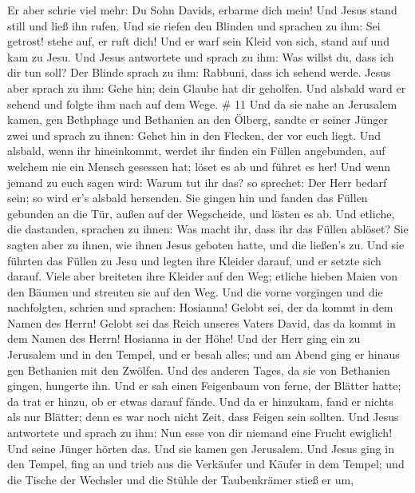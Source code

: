 Er aber schrie viel mehr: Du Sohn Davids, erbarme dich mein!
 Und Jesus stand still und ließ ihn rufen. Und sie riefen
den Blinden und sprachen zu ihm: Sei getrost! stehe auf, er ruft dich!
 Und er warf sein Kleid von sich, stand auf und kam zu
Jesu.  Und Jesus antwortete und sprach zu ihm: Was willst
du, dass ich dir tun soll? Der Blinde sprach zu ihm: Rabbuni, dass ich
sehend werde.  Jesus aber sprach zu ihm: Gehe hin; dein
Glaube hat dir geholfen. Und alsbald ward er sehend und folgte ihm nach
auf dem Wege. \# 11  Und da sie nahe an Jerusalem kamen, gen
Bethphage und Bethanien an den Ölberg, sandte er seiner Jünger zwei
 und sprach zu ihnen: Gehet hin in den Flecken, der vor euch
liegt. Und alsbald, wenn ihr hineinkommt, werdet ihr finden ein Füllen
angebunden, auf welchem nie ein Mensch gesessen hat; löset es ab und
führet es her!  Und wenn jemand zu euch sagen wird: Warum
tut ihr das? so sprechet: Der Herr bedarf sein; so wird er's alsbald
hersenden.  Sie gingen hin und fanden das Füllen gebunden an
die Tür, außen auf der Wegscheide, und lösten es ab.  Und
etliche, die dastanden, sprachen zu ihnen: Was macht ihr, dass ihr das
Füllen ablöset?  Sie sagten aber zu ihnen, wie ihnen Jesus
geboten hatte, und die ließen's zu.  Und sie führten das
Füllen zu Jesu und legten ihre Kleider darauf, und er setzte sich
darauf.  Viele aber breiteten ihre Kleider auf den Weg;
etliche hieben Maien von den Bäumen und streuten sie auf den Weg.
 Und die vorne vorgingen und die nachfolgten, schrien und
sprachen: Hosianna! Gelobt sei, der da kommt in dem Namen des Herrn!
 Gelobt sei das Reich unseres Vaters David, das da kommt in
dem Namen des Herrn! Hosianna in der Höhe!  Und der Herr
ging ein zu Jerusalem und in den Tempel, und er besah alles; und am
Abend ging er hinaus gen Bethanien mit den Zwölfen.  Und
des anderen Tages, da sie von Bethanien gingen, hungerte ihn.
 Und er sah einen Feigenbaum von ferne, der Blätter hatte;
da trat er hinzu, ob er etwas darauf fände. Und da er hinzukam, fand er
nichts als nur Blätter; denn es war noch nicht Zeit, dass Feigen sein
sollten.  Und Jesus antwortete und sprach zu ihm: Nun esse
von dir niemand eine Frucht ewiglich! Und seine Jünger hörten das.
 Und sie kamen gen Jerusalem. Und Jesus ging in den Tempel,
fing an und trieb aus die Verkäufer und Käufer in dem Tempel; und die
Tische der Wechsler und die Stühle der Taubenkrämer stieß er um,
